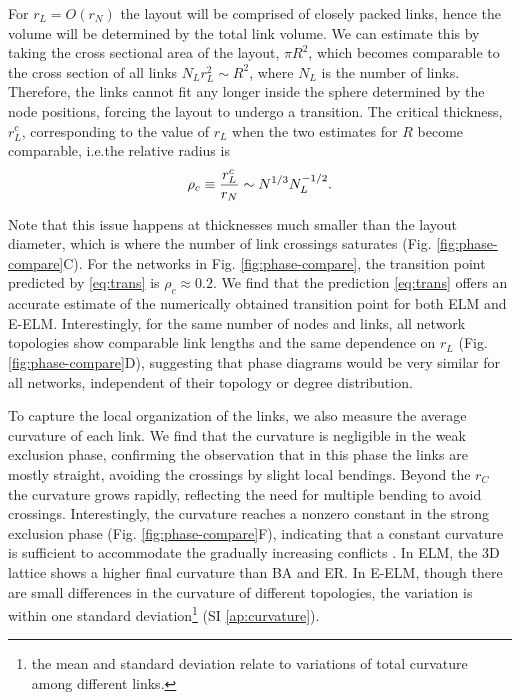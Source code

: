 \documentclass[nofootinbib,preprint,floatfix,titlepage,endfloats]{revtex4} %
\begin{document}
For $r_L = O(r_N)$ the layout will be comprised of closely packed links, hence the volume will be determined by the total link volume. We can estimate this by taking the cross sectional area of the layout, $\pi R^2$, which becomes comparable to the cross section of all links $ N_L r_L^2 \sim R^2$, where $N_L$ is the number of links. 
Therefore, the links cannot fit any longer inside the sphere determined by the node positions, forcing the layout to undergo a transition. The critical thickness, $r^c_L$, corresponding to the value of $r_L$ when the two estimates for $R$ become comparable, i.e.the relative radius is 
\begin{equation}
    \rho_c \equiv {r^c_L\over r_N} \sim N^{1/3} N_L^{-1/2}. \label{eq:trans}
\end{equation}


Note that this issue happens at thicknesses much smaller than the layout diameter, which is where the number of link crossings saturates (Fig. \ref{fig:phase-compare}C).
For the networks in Fig. \ref{fig:phase-compare}, the transition point predicted by \eqref{eq:trans} is 
$\rho_c \approx 0.2$.
We find that the prediction \eqref{eq:trans} offers an accurate estimate of the numerically obtained transition point for both ELM and E-ELM. 
Interestingly, for the same number of nodes and links, all network topologies show comparable link lengths and the same dependence on $r_L$ (Fig. \ref{fig:phase-compare}D), 
suggesting that phase diagrams would be very similar for all networks, independent of their topology or degree distribution.

To capture the local organization of the links,
we also measure the average curvature of each link.
We find that the curvature is negligible in the weak exclusion phase, confirming the observation that in this phase the links are mostly straight, avoiding the crossings by slight local bendings. Beyond the $r_C$ the curvature grows rapidly, reflecting the need for multiple bending to avoid crossings. Interestingly, the curvature reaches a nonzero constant in the strong exclusion phase (Fig. \ref{fig:phase-compare}F), indicating that a constant curvature is sufficient to accommodate the gradually increasing conflicts . In ELM, the 3D lattice shows a higher final curvature than BA and ER. 
In E-ELM, though there are small differences in the curvature of different topologies, the variation is within one standard deviation\footnote{the mean and standard deviation relate to variations of total curvature among different links. } (SI \ref{ap:curvature}).  
\end{document}
